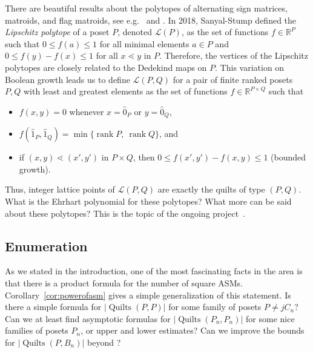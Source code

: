 \documentclass[12pt]{amsart}
\numberwithin{equation}{section}
\theoremstyle{definition}
\newcommand{\quilt}{\operatorname{Quilts}}
\newcommand{\rank}{\operatorname{rank}}
\begin{document}
There are beautiful results about the polytopes of alternating sign
matrices, matroids, and flag matroids, see e.g.~\cite{striker} and
\cite{CAMERON.DINU.MICHALEK.SEYNNAEVE}.  In 2018, Sanyal-Stump
\cite{Sanyal-Stump.2018} defined the \emph{Lipschitz polytope} of a
poset $P$, denoted $\mathcal{L}(P)$, as the set of functions $f \in
\mathbb{R}^{P}$ such that $ 0\leq f(a)\leq 1$ for all minimal elements
$a \in P$ and $0\leq f(y)-f(x)\leq 1 $ for all $x \lessdot y$ in $P$.
Therefore, the vertices of the Lipschitz polytopes are closely related
to the Dedekind maps on $P$.  This variation on Boolean growth leads
us to define $\mathcal{L}(P,Q)$ for a pair of finite ranked posets
$P,Q$ with least and greatest elements as the set of functions $f \in
\mathbb{R}^{P\times Q}$ such that
\begin{itemize}
 \item $f(x,y) = 0$ whenever $x = \hat 0_P$ or $y = \hat 0_Q$,
\item $f(\hat 1_P, \hat 1_Q) = \min\{\rank P,\  \rank
Q\}$, and
\item if $(x,y) \lessdot (x',y')$ in $P \times Q$, then $0\leq
f(x',y')-f(x,y)\leq 1$ (bounded growth).
\end{itemize}
Thus, integer lattice points of $\mathcal{L}(P,Q)$ are exactly the
quilts of type $(P,Q)$.  What is the Ehrhart polynomial for these
polytopes?  What more can be said about these
polytopes? This is the topic of the ongoing project~\cite{bk}.

\subsection*{Enumeration} As we stated in the introduction, one of the
most fascinating facts in the area is that there is a product formula
for the number of square ASMs. Corollary~\ref{cor:powerofasm} gives a
simple generalization of this statement. Is there a simple formula for
$|\quilt(P,P)|$ for some family of posets $P \neq j C_n$? Can we at
least find asymptotic formulas for $|\quilt(P_n,P_n)|$ for some nice
families of posets $P_n$, or upper and lower estimates?  Can we
improve the bounds for $|\quilt(P,B_n)|$ beyond ?
\end{document}
